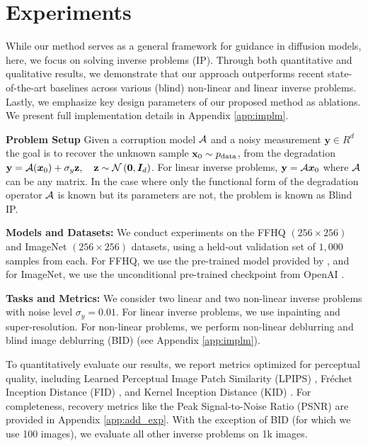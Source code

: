 \section{Experiments}
\label{sec:experiments}
While our method serves as a general framework for guidance in diffusion models, here, we focus on solving inverse problems (IP). Through both quantitative and qualitative results, we demonstrate that our approach outperforms recent state-of-the-art baselines across various (blind) non-linear and linear inverse problems. Lastly, we emphasize key design parameters of our proposed method as ablations. We present full implementation details in Appendix \ref{app:implm}.

\textbf{Problem Setup}
Given a corruption model ${\mathcal{A}}$ and a noisy measurement $\mathbf{y} \in R^d$ the goal is to recover the unknown sample ${\mathbf{x}}_0 \sim p_\text{data}$, from the degradation $\mathbf{y}={\mathcal{A}} ({\bm{x}}_0)+\sigma_{y} {\mathbf{z}}, \quad{\mathbf{z}} \sim {\mathcal{N}}\left(\mathbf{0}, {\bm{I}}_d\right)$. For linear inverse problems, $\mathbf{y}={\mathcal{A}}{\bm{x}}_0$ where ${\mathcal{A}}$ can be any matrix. In the case where only the functional form of the degradation operator ${\mathcal{A}}$ is known but its parameters are not, the problem is known as Blind IP. 

\textbf{Models and Datasets:} We conduct experiments on the FFHQ $(256 \times 256)$ \citep{ffhq} and ImageNet $(256 \times 256)$ \citep{deng2009imagenet} datasets, using a held-out validation set of $1,000$ samples from each. For FFHQ, we use the pre-trained model provided by \citet{chung2022diffusion}, and for ImageNet, we use the unconditional pre-trained checkpoint from OpenAI \citep{dhariwal2021diffusion}.

\textbf{Tasks and Metrics:}
We consider two linear and two non-linear inverse problems with noise level $\sigma_y=0.01$. For linear inverse problems, we use inpainting and super-resolution. For non-linear problems, we perform non-linear deblurring and blind image deblurring (BID) (see Appendix \ref{app:implm}).

To quantitatively evaluate our results, we report metrics optimized for perceptual quality, including Learned Perceptual Image Patch Similarity (LPIPS) \citep{lpips}, Fréchet Inception Distance (FID) \citep{fid}, and Kernel Inception Distance (KID) \citep{kid}. For completeness, recovery metrics like the Peak Signal-to-Noise Ratio (PSNR) are provided in Appendix \ref{app:add_exp}. With the exception of BID (for which we use 100 images), we evaluate all other inverse problems on 1k images.

